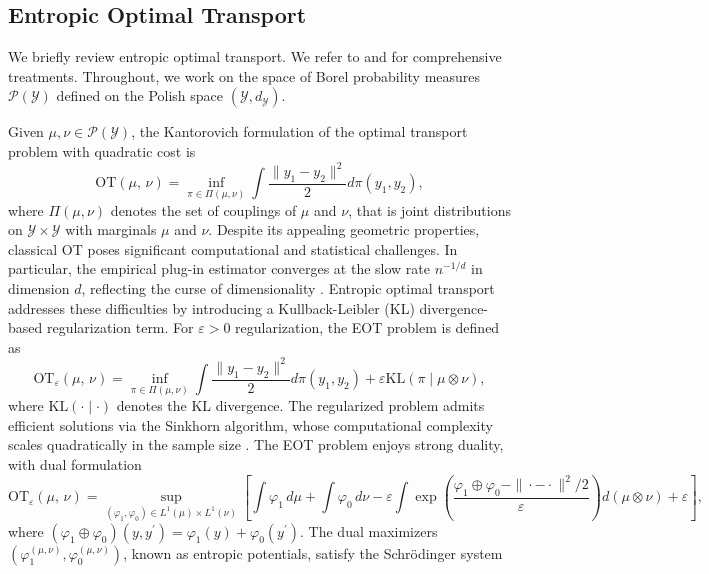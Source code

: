 \documentclass{article}
\theoremstyle{plain}
\theoremstyle{definition}
\theoremstyle{remark}
\newcommand{\of}[1]{\left(#1\right)}
\newcommand{\cP}{\mathcal{P}}
\newcommand{\cY}{\mathcal{Y}}
\newcommand{\1}{\mathbbm{1}}
\newcommand{\OT}[2]{\text{OT}\of{#1,\, #2}}
\newcommand{\EntOT}[2]{\text{OT}_\eps\of{#1,\, #2}}
\newcommand{\eps}{\varepsilon}
\newcommand{\KL}[2]{\mathrm{KL}(#1 \mid #2)}
\theoremstyle{plain}
\theoremstyle{definition}
\begin{document}
\subsection{Entropic Optimal Transport}\label{appendix:eot}

We briefly review entropic optimal transport. We refer to \citet{leonard2013survey} and \citet{cuturi2013sinkhorn} for comprehensive treatments. Throughout, we work on the space of Borel probability measures $\cP(\cY)$ defined on the Polish space $(\cY, d_\cY)$.

Given $\mu, \nu \in \cP(\cY)$, the Kantorovich formulation of the optimal transport problem \citep{kantorovich2006translocation,villani2009optimal} with quadratic cost is
\begin{equation}\label{eq:OT}
    \OT{\mu}{\nu} = \inf_{\pi \in \Pi(\mu, \nu)} \int \frac{\|y_1 - y_2\|^2}{2} d\pi(y_1, y_2),
\end{equation}
where $\Pi(\mu, \nu)$ denotes the set of couplings of $\mu$ and $\nu$, that is joint distributions on $\cY \times \cY$ with marginals $\mu$ and $\nu$. 
Despite its appealing geometric properties, classical OT poses significant computational and statistical challenges. In particular, the empirical plug-in estimator converges at the slow rate $n^{-1/d}$ in dimension $d$, reflecting the curse of dimensionality \cite{fournier2015rate, manole2024sharp}. Entropic optimal transport addresses these difficulties by introducing a Kullback-Leibler (KL) divergence-based regularization term. For $\eps > 0$ regularization, the EOT problem is defined as
\begin{equation}
    \EntOT{\mu}{\nu} = \inf_{\pi \in \Pi(\mu, \nu)} \int \frac{\|y_1-y_2\|^2}{2} d\pi(y_1, y_2) + \eps \KL{\pi}{\mu \otimes \nu},
\end{equation}
where $\KL{\cdot}{\cdot}$ denotes the KL divergence. The regularized problem admits efficient solutions via the Sinkhorn algorithm, whose computational complexity scales quadratically in the sample size \citep{cuturi2013sinkhorn}.
The EOT problem enjoys strong duality, with dual formulation
\begin{equation}\label{eq:dual_EOT}
    \EntOT{\mu}{\nu} = \sup_{(\varphi_1, \varphi_0) \in L^1(\mu) \times L^1(\nu)} \left[\int \varphi_1 \, d\mu + \int \varphi_0 \, d\nu - \eps \int \exp\of{\frac{\varphi_1 \oplus \varphi_0 - \|\cdot - \cdot\|^2/2}{\eps}} d(\mu \otimes \nu) + \eps\right],
\end{equation}
where $(\varphi_1 \oplus \varphi_0)(y, y^\prime) = \varphi_1(y) + \varphi_0(y^\prime)$. The dual maximizers $(\varphi_1^{(\mu, \nu)}, \varphi_0^{(\mu, \nu)})$, known as entropic potentials, satisfy the Schrödinger system
\end{document}
